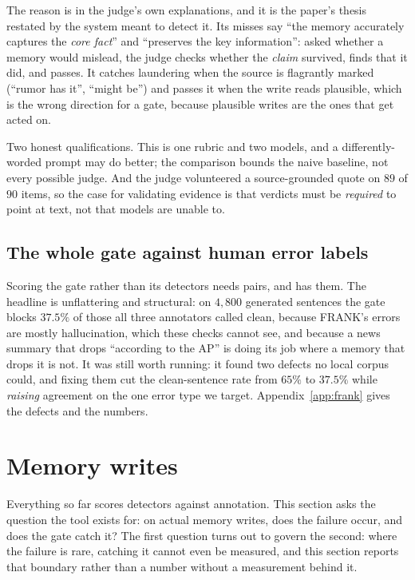 \documentclass[11pt]{article}
\begin{document}
The reason is in the judge's own explanations, and it is the paper's thesis restated by
the system meant to detect it. Its misses say ``the memory accurately captures the
\emph{core fact}'' and ``preserves the key information'': asked whether a memory would
mislead, the judge checks whether the \emph{claim} survived, finds that it did, and
passes. It catches laundering when the source is flagrantly marked (``rumor has it'',
``might be'') and passes it when the write reads plausible, which is the wrong direction
for a gate, because plausible writes are the ones that get acted on.

Two honest qualifications. This is one rubric and two models, and a differently-worded
prompt may do better; the comparison bounds the naive baseline, not every possible
judge. And the judge volunteered a source-grounded quote on $89$ of $90$ items, so the
case for validating evidence is that verdicts must be \emph{required} to point at text,
not that models are unable to.

\subsection{The whole gate against human error labels}
\label{sec:frank}
Scoring the gate rather than its detectors needs pairs, and \citet{pagnoni2021frank} has
them. The headline is unflattering and structural: on $4{,}800$ generated sentences the
gate blocks $37.5\%$ of those all three annotators called clean, because FRANK's errors
are mostly hallucination, which these checks cannot see, and because a news summary that
drops ``according to the AP'' is doing its job where a memory that drops it is not. It
was still worth running: it found two defects no local corpus could, and fixing them cut
the clean-sentence rate from $65\%$ to $37.5\%$ while \emph{raising} agreement on the one
error type we target. Appendix~\ref{app:frank} gives the defects and the numbers.

\section{Memory writes}
\label{sec:writes}

Everything so far scores detectors against annotation. This section asks the question the
tool exists for: on actual memory writes, does the failure occur, and does the gate catch
it? The first question turns out to govern the second: where the failure is rare, catching
it cannot even be measured, and this section reports that boundary rather than a number
without a measurement behind it.
\end{document}
